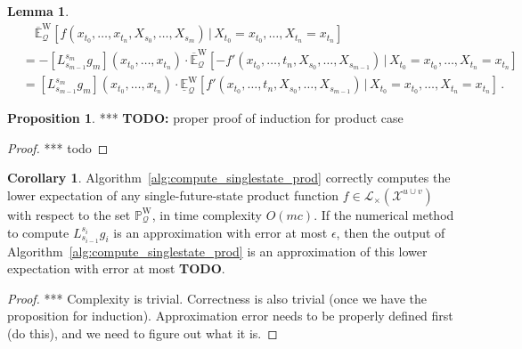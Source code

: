 \documentclass[10pt]{paper}
\theoremstyle{definition}
\newtheorem{proposition}[theorem]{Proposition}
\newtheorem{corollary}[theorem]{Corollary}
\newtheorem{lemma}[theorem]{Lemma}
\newcommand{\states}{\mathcal{X}}
\newcommand{\processes}{\mathbb{P}}
\newcommand{\wprocesses}{\processes^{\mathrm{W}}}
\newcommand{\gambles}{\mathcal{L}}
\newcommand{\rateset}{\mathcal{Q}}
\begin{document}
\begin{lemma}
\begin{align*}
&\quad \overline{\mathbb{E}}_\rateset^\mathrm{W}[f(x_{t_0},\ldots,x_{t_n},X_{s_0},\ldots,X_{s_m})\,\vert\,X_{t_0}=x_{t_0},\ldots,X_{t_n}=x_{t_n}] \\
 &= -[L_{s_{m-1}}^{s_m}g_m](x_{t_0},\ldots,x_{t_n})\cdot\overline{\mathbb{E}}_\rateset^\mathrm{W}\left[ -f'(x_{t_0},\ldots,t_n,X_{s_0},\ldots,X_{s_{m-1}})\,\Big\vert\,X_{t_0}=x_{t_0},\ldots,X_{t_n}=x_{t_n}\right] \\
 &= [L_{s_{m-1}}^{s_m}g_m](x_{t_0},\ldots,x_{t_n})\cdot\underline{\mathbb{E}}_\rateset^\mathrm{W}\left[f'(x_{t_0},\ldots,t_n,X_{s_0},\ldots,X_{s_{m-1}})\,\Big\vert\,X_{t_0}=x_{t_0},\ldots,X_{t_n}=x_{t_n}\right] \,.
\end{align*}
\end{lemma}

\begin{proposition}
*** {\bf TODO:} proper proof of induction for product case
\end{proposition}
\begin{proof}
*** todo
\end{proof}

\begin{corollary}
Algorithm~\ref{alg:compute_singlestate_prod} correctly computes the lower expectation of any single-future-state product function $f\in\gambles_\times(\states^{u\cup v})$ with respect to the set $\wprocesses_\rateset$, in time complexity $O(mc)$. If the numerical method to compute $L_{s_{i-1}}^{s_i}g_i$ is an approximation with error at most $\epsilon$, then the output of Algorithm~\ref{alg:compute_singlestate_prod} is an approximation of this lower expectation with error at most {\bf TODO}.
\end{corollary}
\begin{proof}
*** Complexity is trivial. Correctness is also trivial (once we have the proposition for induction). Approximation error needs to be properly defined first (do this), and we need to figure out what it is.
\end{proof}
\end{document}
